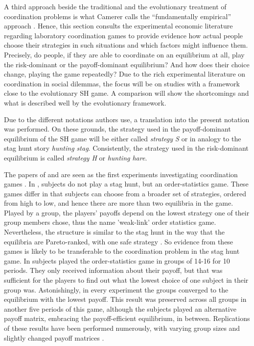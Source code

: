 \label{sec:experimentalevidence}
A third approach beside the traditional and the evolutionary treatment of 
coordination problems is what Camerer calls the 
``fundamentally empirical'' approach \parencite[336]{camerer_behavioral_2003}.
Hence, this section consults the experimental economic literature regarding 
laboratory coordination games to provide evidence how actual people choose
their strategies in such situations and which factors might influence them. 
Precisely, do people, if they are able to coordinate on an equilibrium at all,
play the risk-dominant or the payoff-dominant equilibrium? And how does their
choice change, playing the game repeatedly?
Due to the rich experimental literature on coordination in social 
dilemmas, the focus will be on studies with a framework close to the  
evolutionary SH game. A comparison will show the shortcomings and what
is described well by the evolutionary framework.

Due to the different notations authors use, a translation into the present
notation was performed.
On these grounds, the 
strategy used in the payoff-dominant equilibrium of the SH game will be 
either called  \textit{strategy S} or in analogy to the stag hunt story 
\textit{hunting stag}.
Consistently, the strategy used in the risk-dominant equilibrium is called
\textit{strategy H} or \textit{hunting hare}.

The papers of \textcite{van_huyck_tacit_1990} and 
\textcite{cooper_communication_1992} are seen as the first experiments 
investigating coordination games \parencite{devetag_when_2007}.
In \textcite{van_huyck_tacit_1990}, subjects do not play a stag
hunt, but an order-statistics game. These games differ in that subjects can
choose from a broader set of strategies, ordered from high to low, and 
hence there are more than two equilibria in the game. 
Played by a group, the players' payoffs depend on the lowest strategy one of 
their group members chose, thus the name 'weak-link' order statistics game. 
Nevertheless, the structure is similar to the stag hunt in the way 
that the equilibria are Pareto-ranked, with one 
safe strategy \parencite{devetag_when_2007}.
So evidence from these games is likely to be transferable to the 
coordination problem in the stag hunt game. 
In \textcite{van_huyck_tacit_1990} subjects played the order-statistics 
game in 
groups of 14-16 for 10 periods. They only received information about their 
payoff, but that was sufficient for the players to find out what the 
lowest choice of one subject in 
their group was. Astonishingly, in every experiment the groups converged
to the equilibrium with the lowest payoff. 
This result was preserved across all groups in another 
five periods of this game, although the subjects played an alternative payoff
matrix, embracing the payoff-efficient equilibrium, in between. 
Replications of these results have been performed numerously, with 
varying group sizes and slightly changed payoff matrices 
\parencite[6]{devetag_when_2007}.

